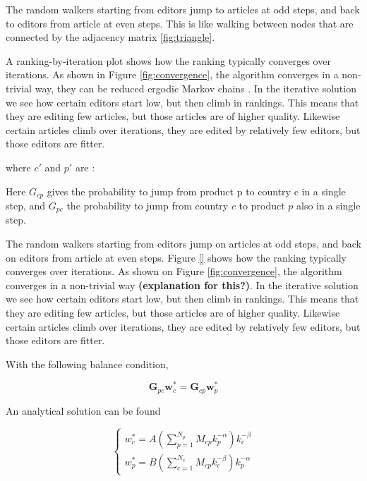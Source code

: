 The random walkers starting from editors jump to articles at odd steps, and back to editors from article at even steps. This is like walking between nodes that are connected by the adjacency matrix \ref{fig:triangle}.



A ranking-by-iteration plot shows how the ranking typically converges over iterations. As shown in Figure \ref{fig:convergence}, the algorithm converges in a non-trivial way, they can be reduced ergodic Markov chains \cite{Firm Grounds}. In the iterative solution we see how certain editors start low, but then climb in rankings. This means that they are editing few articles, but those articles are of higher quality. Likewise certain articles climb over iterations, they are edited by relatively few editors, but those editors are fitter.

where $c'$ and $p'$ are :

Here $G_{cp}$ gives the probability to jump from product p to country c
in a single step, and $G_{pc}$ the probability to jump from country $c$ to
product $p$ also in a single step.


The random walkers starting from editors jump on articles at odd steps, and back on editors from article at even steps. Figure \ref{} shows how the ranking typically converges over iterations. As shown on Figure \ref{fig:convergence}, the algorithm converges in a non-trivial way {\bf (explanation for this?)}. In the iterative solution we see how certain editors start low, but then climb in rankings. This means that they are editing few articles, but those articles are of higher quality. Likewise certain articles climb over iterations, they are edited by relatively few editors, but those editors are fitter.


With the following balance condition,

\begin{equation}
\mathbf{G}_{pc} \mathbf{w}^*_c = \mathbf{G}_{cp} \mathbf{w}^*_p
\end{equation}

An analytical solution can be found \cite{caldarelli}

\begin{equation}
\begin{cases}
 w^*_c = A(\sum^{N_p}_{p=1} M_{cp}k_p^{-\alpha})k_c^{-\beta} \\
w^*_p = B(\sum^{N_c}_{c=1} M_{cp}k_c^{-\beta})k_p^{-\alpha}
\end{cases}
\end{equation}

